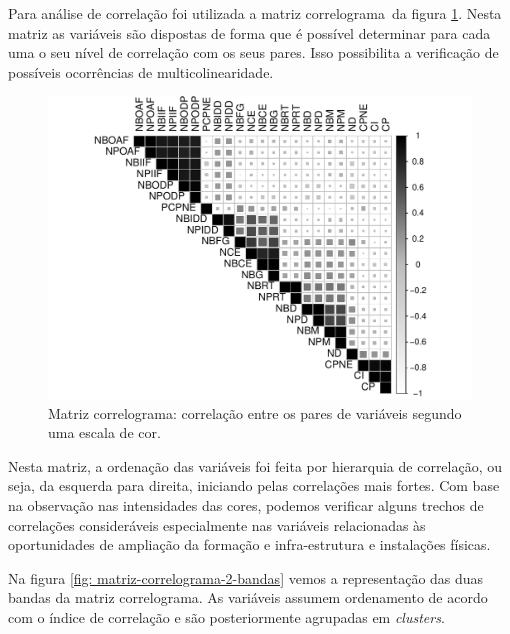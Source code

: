 Para análise de correlação foi utilizada a matriz correlograma\footnotemark~da figura \ref{fig: matriz-correlograma1}. Nesta matriz as variáveis são dispostas de forma que é possível determinar para cada uma o seu nível de correlação com os seus pares. Isso possibilita a verificação de possíveis ocorrências de multicolinearidade.

\begin{figure}[H]
		\centering
		\includegraphics[scale=.75]{../../graficos/latex-graph-matriz-correlacao}
		\caption{Matriz correlograma: correlação entre os pares de variáveis segundo uma escala de cor.}
		\label{fig: matriz-correlograma1}
\end{figure}

Nesta matriz, a ordenação das variáveis foi feita por hierarquia de correlação, ou seja, da esquerda para direita, iniciando pelas correlações mais fortes. Com base na observação nas intensidades das cores, podemos verificar alguns trechos de correlações consideráveis especialmente nas variáveis relacionadas às oportunidades de ampliação da formação e infra-estrutura e instalações físicas.

Na figura \ref{fig: matriz-correlograma-2-bandas} vemos a representação das duas bandas da matriz correlograma. As variáveis assumem ordenamento de acordo com o índice de correlação e são posteriormente agrupadas em \textit{clusters}.

